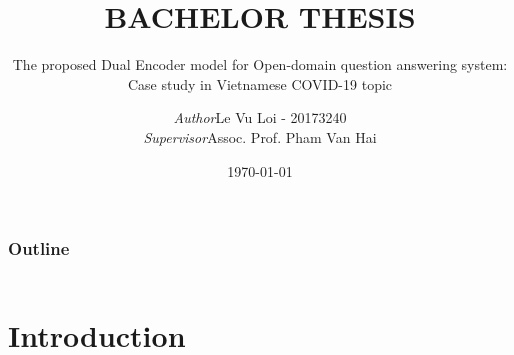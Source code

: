 \documentclass[11pt]{beamer}
\def\mydate{\leavevmode\hbox{\bfseries\the\day/\twodigits\month/\twodigits\year}}
\def\twodigits#1{\ifnum#1<10 0\fi\the#1}
\begin{document}
\captionsenglish
\dateUSenglish
\author[Le Vu Loi]{
	\begin{tabular}{ll}
		\textit{Author} & Le Vu Loi - 20173240 \\
		\textit{Supervisor} & Assoc. Prof. Pham Van Hai
	\end{tabular}
}
\title[]{\bfseries\fontsize{14}{\baselineskip}\selectfont BACHELOR THESIS\vspace{5pt}}
\subtitle{The proposed Dual Encoder model for Open-domain
	question answering system: Case study in Vietnamese
	COVID-19 topic}
\date[\mydate]{\today}

\begin{frame}[plain]
	\maketitle
\end{frame}
\begin{frame}[plain]
\frametitle{Outline}
\begin{columns}[t]
	\begin{column}{.5\textwidth}
		\tableofcontents[sections={1-3}]
	\end{column}
	\begin{column}{.5\textwidth}
		\tableofcontents[sections={4-6}]
	\end{column}
\end{columns}
\end{frame}
\section{Introduction}
\end{document}
